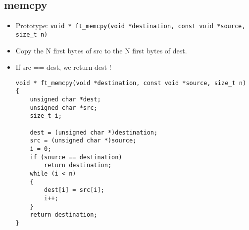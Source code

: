 \documentclass{article}
\begin{document}
		\subsection{memcpy}
			\begin{itemize}[label=$\rightarrow$]
				\item Prototype: \texttt{void * ft\_memcpy(void *destination, const void *source, size\_t n)}
				\item Copy the N first bytes of src to the N first bytes of dest.
				\item If src == dest, we return dest !
				\begin{verbatim}
void * ft_memcpy(void *destination, const void *source, size_t n)               
{                                                                               
    unsigned char *dest;                                                        
    unsigned char *src;                                                         
    size_t i;                                                                   
                                                                                
    dest = (unsigned char *)destination;                                        
    src = (unsigned char *)source;                                              
    i = 0;                                                                      
    if (source == destination)                                                  
        return destination;                                                     
    while (i < n)                                                               
    {                                                                           
        dest[i] = src[i];                                                       
        i++;                                                                    
    }                                                                           
    return destination;                                                         
}  
				\end{verbatim}
			\end{itemize}
		
\end{document}
